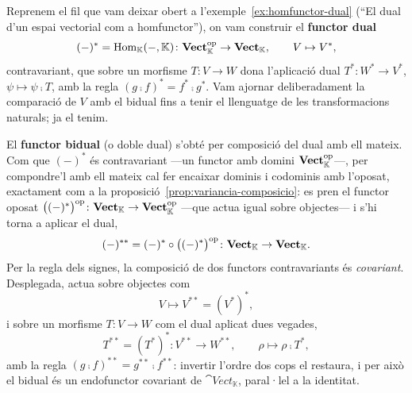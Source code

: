 \begin{exemple}\label{ex:bidual}
Reprenem el fil que vam deixar obert a l'exemple~\ref{ex:homfunctor-dual} (\enquote{El dual d'un espai vectorial com a homfunctor}), on vam construir el \textbf{functor dual}
\[
(-)^*=\operatorname{Hom}_{\mathbb K}(-,\mathbb K)\colon\mathbf{Vect}_{\mathbb K}^{\mathrm{op}}\to\mathbf{Vect}_{\mathbb K},\qquad V\mapsto V^*,
\]
contravariant, que sobre un morfisme $T\colon V\to W$ dona l'aplicació dual $T^*\colon W^*\to V^*$, $\psi\mapsto\psi\comp T$, amb la regla $(g\comp f)^*=f^*\comp g^*$. Vam ajornar deliberadament la comparació de $V$ amb el bidual fins a tenir el llenguatge de les transformacions naturals; ja el tenim.

El \textbf{functor bidual} (o doble dual) s'obté per composició del dual amb ell mateix. Com que $(-)^*$ és contravariant ---un functor amb domini $\mathbf{Vect}_{\mathbb K}^{\mathrm{op}}$---, per compondre'l amb ell mateix cal fer encaixar dominis i codominis amb l'oposat, exactament com a la proposició~\ref{prop:variancia-composicio}: es pren el functor oposat $\bigl((-)^*\bigr)^{\mathrm{op}}\colon\mathbf{Vect}_{\mathbb K}\to\mathbf{Vect}_{\mathbb K}^{\mathrm{op}}$ ---que actua igual sobre objectes--- i s'hi torna a aplicar el dual,
\[
(-)^{**}=(-)^*\circ\bigl((-)^*\bigr)^{\mathrm{op}}\colon\mathbf{Vect}_{\mathbb K}\to\mathbf{Vect}_{\mathbb K}.
\]
Per la regla dels signes, la composició de dos functors contravariants és \emph{covariant}. Desplegada, actua sobre objectes com
\[
V\mapsto V^{**}=(V^*)^*,
\]
i sobre un morfisme $T\colon V\to W$ com el dual aplicat dues vegades,
\[
T^{**}=(T^*)^*\colon V^{**}\to W^{**},\qquad \rho\mapsto\rho\comp T^*,
\]
amb la regla $(g\comp f)^{**}=g^{**}\comp f^{**}$: invertir l'ordre dos cops el restaura, i per això el bidual és un endofunctor covariant de $\cat{Vect}_{\mathbb K}$, paral·lel a la identitat.


\end{exemple}
